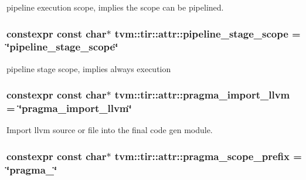 pipeline execution scope, implies the scope can be pipelined. 

\subsubsection[{\texorpdfstring{pipeline\+\_\+stage\+\_\+scope}{pipeline_stage_scope}}]{\setlength{\rightskip}{0pt plus 5cm}constexpr const char$\ast$ tvm\+::tir\+::attr\+::pipeline\+\_\+stage\+\_\+scope = \char`\"{}pipeline\+\_\+stage\+\_\+scope\char`\"{}}\hypertarget{namespacetvm_1_1tir_1_1attr_a19ecbf068afc115a2282e533c0fe518d}{}\label{namespacetvm_1_1tir_1_1attr_a19ecbf068afc115a2282e533c0fe518d}


pipeline stage scope, implies always execution 

\subsubsection[{\texorpdfstring{pragma\+\_\+import\+\_\+llvm}{pragma_import_llvm}}]{\setlength{\rightskip}{0pt plus 5cm}constexpr const char$\ast$ tvm\+::tir\+::attr\+::pragma\+\_\+import\+\_\+llvm = \char`\"{}pragma\+\_\+import\+\_\+llvm\char`\"{}}\hypertarget{namespacetvm_1_1tir_1_1attr_af00ba402645b1def7c543af3c48be80d}{}\label{namespacetvm_1_1tir_1_1attr_af00ba402645b1def7c543af3c48be80d}


Import llvm source or file into the final code gen module. 

\subsubsection[{\texorpdfstring{pragma\+\_\+scope\+\_\+prefix}{pragma_scope_prefix}}]{\setlength{\rightskip}{0pt plus 5cm}constexpr const char$\ast$ tvm\+::tir\+::attr\+::pragma\+\_\+scope\+\_\+prefix = \char`\"{}pragma\+\_\+\char`\"{}}\hypertarget{namespacetvm_1_1tir_1_1attr_af08d3d2b645a914f1a64d81e45f3b86a}{}\label{namespacetvm_1_1tir_1_1attr_af08d3d2b645a914f1a64d81e45f3b86a}


